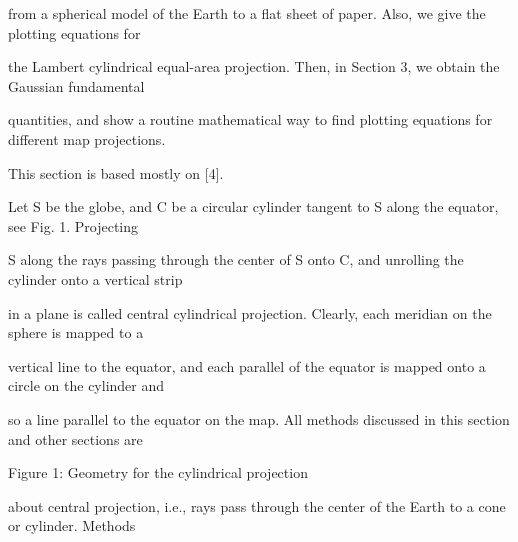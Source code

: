 \documentclass[a4paper,portrait,12pt]{article}
\begin{document}
\begin{flushleft}
from a spherical model of the Earth to a flat sheet of paper. Also, we give the plotting equations for
\end{flushleft}


\begin{flushleft}
the Lambert cylindrical equal-area projection. Then, in Section 3, we obtain the Gaussian fundamental
\end{flushleft}


\begin{flushleft}
quantities, and show a routine mathematical way to find plotting equations for different map projections.
\end{flushleft}


\begin{flushleft}
This section is based mostly on [4].
\end{flushleft}


\begin{flushleft}
Let S be the globe, and C be a circular cylinder tangent to S along the equator, see Fig. 1. Projecting
\end{flushleft}


\begin{flushleft}
S along the rays passing through the center of S onto C, and unrolling the cylinder onto a vertical strip
\end{flushleft}


\begin{flushleft}
in a plane is called central cylindrical projection. Clearly, each meridian on the sphere is mapped to a
\end{flushleft}


\begin{flushleft}
vertical line to the equator, and each parallel of the equator is mapped onto a circle on the cylinder and
\end{flushleft}


\begin{flushleft}
so a line parallel to the equator on the map. All methods discussed in this section and other sections are
\end{flushleft}





\begin{flushleft}
Figure 1: Geometry for the cylindrical projection
\end{flushleft}


\begin{flushleft}
about central projection, i.e., rays pass through the center of the Earth to a cone or cylinder. Methods
\end{flushleft}
\end{document}
